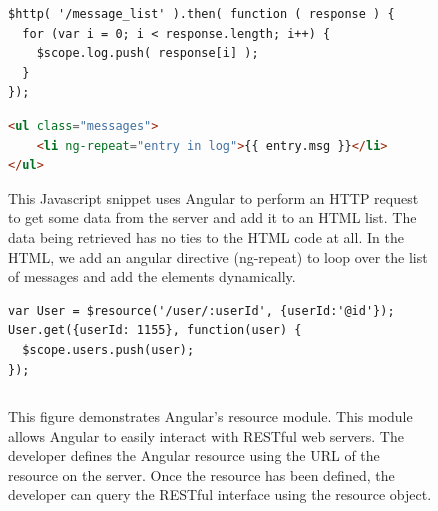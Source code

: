 
\begin{figure}
\begin{center}
\begin{lstlisting}
$http( '/message_list' ).then( function ( response ) {
  for (var i = 0; i < response.length; i++) {
    $scope.log.push( response[i] );
  }
});
\end{lstlisting}
\begin{lstlisting}[language=HTML]
<ul class="messages">
    <li ng-repeat="entry in log">{{ entry.msg }}</li>
</ul>
\end{lstlisting}
\caption[Angular DOM Manipulation]{This Javascript snippet uses Angular to perform an HTTP request to get some data from the server and add it to an HTML list. The data being retrieved has no ties to the HTML code at all. In the HTML, we add an angular directive (ng-repeat) to loop over the list of messages and add the elements dynamically.\label{fig:angular_example}}
\end{center}
\end{figure}

\begin{figure}
\begin{center}
\begin{lstlisting}
var User = $resource('/user/:userId', {userId:'@id'});
User.get({userId: 1155}, function(user) {
  $scope.users.push(user);
});
\end{lstlisting}
\begin{lstlisting}

\end{lstlisting}
\caption[Angular Resource Module]{This figure demonstrates Angular's resource module. This module allows Angular to easily interact with RESTful web servers. The developer defines the Angular resource using the URL of the resource on the server. Once the resource has been defined, the developer can query the RESTful interface using the resource object.\label{fig:angular_resource}}
\end{center}
\end{figure}

